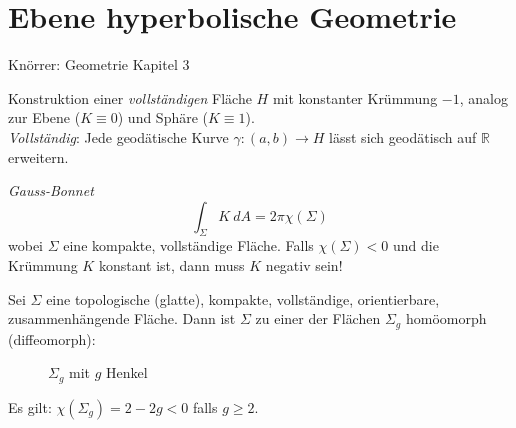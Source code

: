 \documentclass[../main.tex]{subfiles}
\begin{document}
\chapter{Ebene hyperbolische Geometrie}
Knörrer: Geometrie Kapitel 3

\begin{goal}
    Konstruktion einer \emph{vollständigen} Fläche $H$ mit konstanter Krümmung $-1$, analog zur Ebene
    ($K \equiv 0$) und Sphäre ($K \equiv 1$).\\
    \emph{Vollständig}: Jede geodätische Kurve $\gamma : (a,b) \to H$ lässt sich geodätisch auf $\mathbb{R}$ erweitern.
\end{goal}

\begin{motivation}
    \emph{Gauss-Bonnet}
    $$\int _ \Sigma K \ dA = 2 \pi \chi (\Sigma)$$
    wobei $\Sigma$ eine kompakte, vollständige Fläche.
    Falls $\chi (\Sigma) < 0$ und die Krümmung $K$ konstant ist, dann muss $K$ negativ sein!

    \begin{theorem}
        Sei $\Sigma$ eine topologische (glatte), kompakte, vollständige, orientierbare, zusammenhängende Fläche.
        Dann ist $\Sigma$ zu einer der Flächen $\Sigma _g$ homöomorph (diffeomorph): \\
        \begin{figure}[htb]
            \centering
            \def\svgwidth{20em}
            
            \caption*{$\Sigma _g$ mit $g$ Henkel}        
        \end{figure}

        Es gilt: $\chi (\Sigma _g)= 2-2g <0$ falls $g \ge 2$.

    \end{theorem}
\end{motivation}

\newpage
\end{document}
